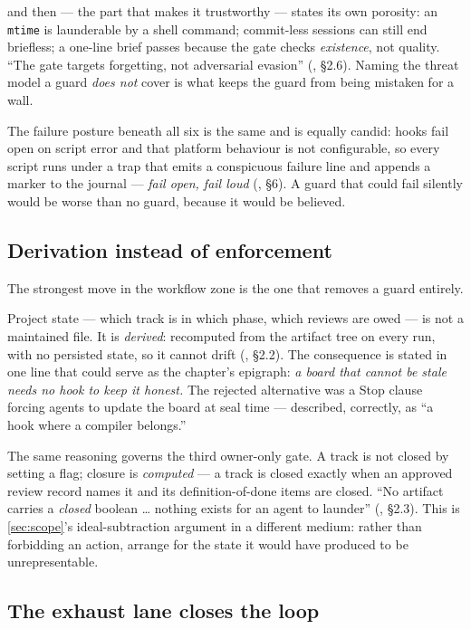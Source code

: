\noindent and then --- the part that makes it trustworthy --- states its own
porosity: an \texttt{mtime} is launderable by a shell command; commit-less sessions
can still end briefless; a one-line brief passes because the gate checks
\emph{existence}, not quality. ``The gate targets forgetting, not adversarial
evasion'' (, \S 2.6). Naming the threat model a
guard \emph{does not} cover is what keeps the guard from being mistaken for a wall.

The failure posture beneath all six is the same and is equally candid: hooks fail
open on script error and that platform behaviour is not configurable, so every
script runs under a trap that emits a conspicuous failure line and appends a marker
to the journal --- \emph{fail open, fail loud}
(, \S 6). A guard that could fail silently would be
worse than no guard, because it would be believed.

\subsection*{Derivation instead of enforcement}

The strongest move in the workflow zone is the one that removes a guard entirely.

Project state --- which track is in which phase, which reviews are owed --- is not
a maintained file. It is \emph{derived}: recomputed from the artifact tree on every
run, with no persisted state, so it cannot drift
(, \S 2.2). The consequence is stated
in one line that could serve as the chapter's epigraph: \emph{a board that cannot
be stale needs no hook to keep it honest.} The rejected alternative was a Stop
clause forcing agents to update the board at seal time --- described, correctly, as
``a hook where a compiler belongs.''

The same reasoning governs the third owner-only gate. A track is not closed by
setting a flag; closure is \emph{computed} --- a track is closed exactly when an
approved review record names it and its definition-of-done items are closed. ``No
artifact carries a \emph{closed} boolean \ldots{} nothing exists for an agent to
launder'' (, \S 2.3). This is
\autoref{sec:scope}'s ideal-subtraction argument in a
different medium: rather than forbidding an action, arrange for the state it would
have produced to be unrepresentable.

\subsection*{The exhaust lane closes the loop}

